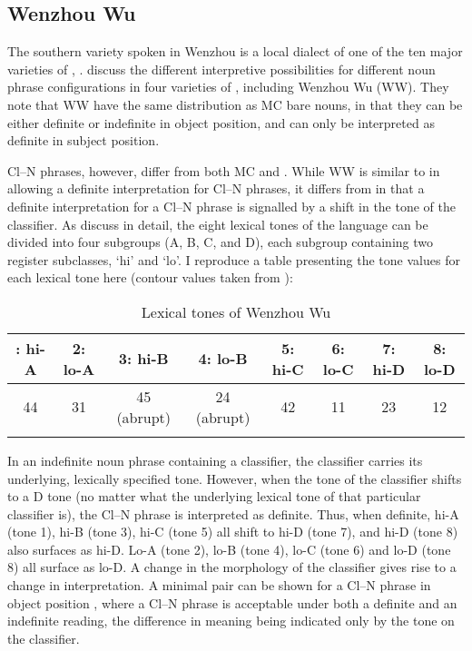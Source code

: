 \documentclass[output=paper
,modfonts
,nonflat]{langsci/langscibook}
\begin{document}
\subsection{Wenzhou Wu} \label{sec:hall:4.1}

The southern  variety spoken in Wenzhou is a local dialect of one of the ten major varieties of , . \citet{ChengSybesma2005} discuss the different interpretive possibilities for different noun phrase configurations in four varieties of , including Wenzhou Wu (WW). They note that WW  have the same distribution as MC bare nouns, in that they can be either definite or indefinite in object position, and can only be interpreted as definite in subject position.

Cl--N phrases, however, differ from both MC and . While WW is similar to  in allowing a definite interpretation for Cl--N phrases, it differs from  in that a definite interpretation for a Cl--N phrase is signalled by a shift in the tone of the classifier. As \citet{ChengSybesma2005} discuss in detail, the eight lexical tones of the language can be divided into four subgroups (A, B, C, and D), each subgroup containing two register subclasses, `hi' and `lo'. I reproduce a table presenting the tone values for each lexical tone here (contour values taken from \citealt{Norman1988}):

\begin{table}[h] \small
\caption{Lexical tones of Wenzhou Wu}
\begin{tabularx}{\textwidth}{cccccccc}
\lsptoprule
1: hi-A&2: lo-A&3: hi-B&4: lo-B&5: hi-C&6: lo-C&7: hi-D&8: lo-D\\
\midrule
44&31&45 (abrupt)&24 (abrupt)&42&11&23&12\\
\lspbottomrule
\end{tabularx}
\end{table}

In an indefinite noun phrase containing a classifier, the classifier carries its underlying, lexically specified tone. However, when the tone of the classifier shifts to a D tone (no matter what the underlying lexical tone of that particular classifier is), the Cl--N phrase is interpreted as definite. Thus, when definite, hi-A (tone 1), hi-B (tone 3), hi-C (tone 5) all shift to hi-D (tone 7), and hi-D (tone 8) also surfaces as hi-D. Lo-A (tone 2), lo-B (tone 4), lo-C (tone 6) and lo-D (tone 8) all surface as lo-D. A change in the morphology of the classifier gives rise to a change in interpretation. A minimal pair can be shown for a Cl--N phrase in object position , where a Cl--N phrase is acceptable under both a definite and an indefinite reading, the difference in meaning being indicated only by the tone on the classifier.
\end{document}
